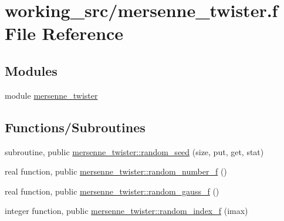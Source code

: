 \hypertarget{mersenne__twister_8f}{}\section{working\+\_\+src/mersenne\+\_\+twister.f File Reference}
\label{mersenne__twister_8f}
\subsection*{Modules}
\begin{DoxyCompactItemize}
\item 
module \hyperlink{namespacemersenne__twister}{mersenne\+\_\+twister}
\end{DoxyCompactItemize}
\subsection*{Functions/\+Subroutines}
\begin{DoxyCompactItemize}
\item 
subroutine, public \hyperlink{namespacemersenne__twister_ab5807578f927f719be280774b17803ad}{mersenne\+\_\+twister\+::random\+\_\+seed} (size, put, get, stat)
\item 
real function, public \hyperlink{namespacemersenne__twister_a72d5b1cd21e6af407325bb8b0e18481a}{mersenne\+\_\+twister\+::random\+\_\+number\+\_\+f} ()
\item 
real function, public \hyperlink{namespacemersenne__twister_acd01aa05ecfbe1c3283dc3552fc9a437}{mersenne\+\_\+twister\+::random\+\_\+gauss\+\_\+f} ()
\item 
integer function, public \hyperlink{namespacemersenne__twister_acc59b5b06bcd98e292ffeaeae88c9c5e}{mersenne\+\_\+twister\+::random\+\_\+index\+\_\+f} (imax)
\end{DoxyCompactItemize}
